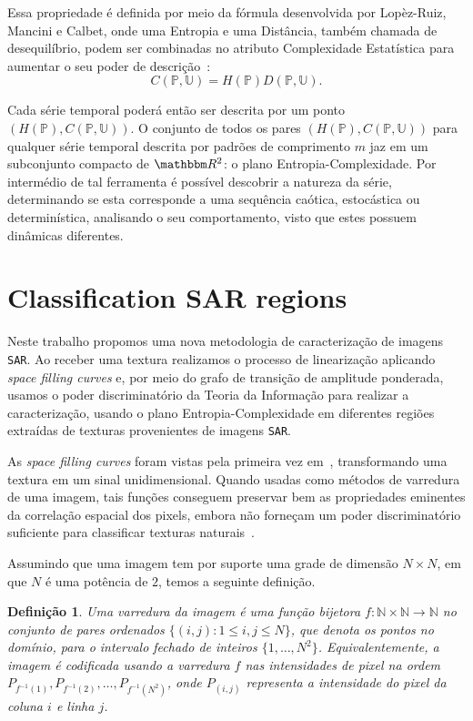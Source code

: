 \documentclass[12pt]{article}
\begin{document}
Essa propriedade é definida por meio da fórmula desenvolvida por Lopèz-Ruiz, Mancini e Calbet, onde uma Entropia e uma Distância, também chamada de desequilíbrio, podem ser combinadas no atributo Complexidade Estatística para aumentar o seu poder de descrição~\citep{Feldman2008information,Feldman1998Statistical,Lopez1995statistical}:
\begin{equation}
C(\mathbb{P}, \mathbb{U}) = H(\mathbb{P}) D(\mathbb{P}, \mathbb{U}).
\end{equation}

Cada série temporal poderá então ser descrita por um ponto $(H(\mathbb{P}), C(\mathbb{P}, \mathbb{U}))$.
O conjunto de todos os pares $(H(\mathbb{P}), C(\mathbb{P}, \mathbb{U}))$ para qualquer série temporal descrita por padrões de comprimento $m$ jaz em um subconjunto compacto de $\mathbbm R^2$: o plano Entropia-Complexidade. 
Por intermédio de tal ferramenta é possível descobrir a natureza da série, determinando se esta corresponde a uma sequência caótica, estocástica ou determinística, analisando o seu comportamento, visto que estes possuem dinâmicas diferentes.

\section{Classification SAR regions}\label{SAR}

Neste trabalho propomos uma nova metodologia de caracterização de imagens \texttt{SAR}. 
Ao receber uma textura realizamos o processo de linearização aplicando \textit{space filling curves} e, por meio do grafo de transição de amplitude ponderada, usamos o poder discriminatório da Teoria da Informação para realizar a caracterização, usando o plano Entropia-Complexidade em diferentes regiões extraídas de texturas provenientes de imagens \texttt{SAR}.

As \textit{space filling curves} foram vistas pela primeira vez em~\cite{Nguyen1982SpaceFC}, transformando uma textura em um sinal unidimensional.
Quando usadas como métodos de varredura de uma imagem, tais funções conseguem preservar bem as propriedades eminentes da correlação espacial dos pixels, embora não forneçam um poder discriminatório suficiente para classificar texturas naturais~\citep{Lee1994Texture}. 

Assumindo que uma imagem tem por suporte uma grade de dimensão $N \times N$, em que $N$ é uma potência de $2$, temos a seguinte definição. 

\newtheorem{mydef}{Definição}
\begin{mydef}
    Uma varredura da imagem é uma função bijetora $f\colon \mathbb{N} \times \mathbb{N} \to \mathbb{N}$ no conjunto de pares ordenados $\{(i,j) : 1\leq i,j \leq N\}$, que denota os pontos no domínio, para o intervalo fechado de inteiros $\{1, \dots, N^2\}$. Equivalentemente, a imagem é codificada usando a varredura $f$ nas intensidades de pixel na ordem $P_{f^{-1}(1)}, P_{f^{-1}(2)}, \dots, P_{f^{-1}(N^2)}$, onde $P_{(i,j)}$ representa a intensidade do pixel da coluna $i$ e linha $j$.
    \label{def:CurveFilling}
\end{mydef}
\end{document}
